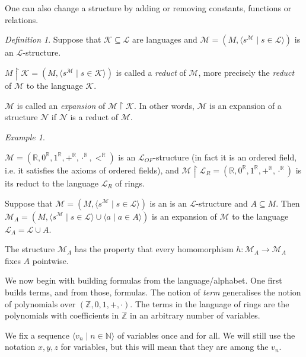 \documentclass[a4paper, 11pt]{amsart}
\theoremstyle{remark}
\newtheorem{definition}[definition]{Definition}
\newtheorem{example}[example]{Example}
\newcommand{\NN}{\mathbb{N}}
\newcommand{\ZZ}{\mathbb{Z}}
\newcommand{\RR}{\mathbb{R}}
\newcommand{\cL}{\mathcal L}
\newcommand{\cM}{\mathcal M}
\newcommand{\cN}{\mathcal N}
\newcommand{\cK}{\mathcal K}
\newenvironment{enumerate-(1)}{\begin{enumerate}[label={\upshape (\arabic*)}, leftmargin=2pc]}{\end{enumerate}}
\begin{document}
One can also change a structure by adding or removing constants, functions or relations. 

\begin{definition} 
Suppose that $\cK\subseteq \cL$ are languages and $\cM=(M,\langle s^\cM\mid s\in \cL \rangle)$ is an $\cL$-structure. 
\begin{enumerate-(1)} 
\item 
$M{\upharpoonright}\cK=(M,\langle s^\cM \mid s\in \cK \rangle)$ is called a \emph{reduct} of $\cM$, more precisely the \emph{reduct} of $\cM$ to the language $\cK$. 
\item 
$\cM$ is called an \emph{expansion} of $\cM{\upharpoonright} \cK$. 
In other words, $\cM$ is an expansion of a structure $\cN$ if $\cN$ is a reduct of $\cM$. 
\end{enumerate-(1)} 
\end{definition} 


\begin{example} \ 
\label{example - canonical model} 
\begin{enumerate-(1)} 
\item 
$\cM=(\RR,0^\RR,1^\RR,+^\RR,\cdot^\RR,<^\RR)$ is an $\cL_{OF}$-structure (in fact it is an ordered field, i.e. it satisfies the axioms of ordered fields), and $\cM{\upharpoonright} \cL_R=(\RR,0^\RR,1^\RR,+^\RR,\cdot^\RR)$ is its reduct to the language $\cL_R$ of rings. 
\item 
Suppose that  $\cM=(M,\langle s^\cM\mid s\in \cL \rangle)$ is an is an $\cL$-structure and $A\subseteq M$. 
Then $\cM_A= (M, \langle s^\cM \mid s\in \cL\rangle \cup \langle a\mid a\in A\rangle)$ is an expansion of $\cM$ to the language $\cL_A= \cL \cup A$. 
\end{enumerate-(1)} 
\end{example} 

The structure $\cM_A$ has the property that every homomorphism $h\colon \cM_A\rightarrow \cM_A$ fixes $A$ pointwise. 


We now begin with building formulas from the language/alphabet. 
One first builds terms, and from those, formulas. 
The notion of \emph{term} generalises the notion of polynomials over $(\ZZ,0,1,+,\cdot)$. 
The terms in the language of rings are the polynomials with coefficients in $\ZZ$ in an arbitrary number of variables. 

We fix a sequence $\langle v_n \mid n\in \NN\rangle$ of variables once and for all. 
We will still use the notation $x,y,z$ for variables, but this will mean that they are among the $v_n$. 
\end{document}

